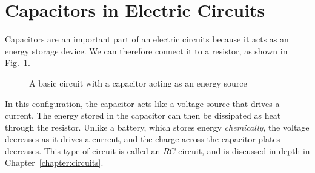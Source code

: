 \section{Capacitors in Electric Circuits}
Capacitors are an important part of an electric circuits because it acts as
an energy storage device. We can therefore connect it to a resistor, as shown
in Fig.~\ref{fig:very-basic-RC}.
\begin{figure}[ht]
  \centering
  \caption{A basic circuit with a capacitor acting as an energy source}
  \label{fig:very-basic-RC}
\end{figure}
In this configuration, the capacitor acts like a voltage source that drives a
current. The energy stored in the capacitor can then be dissipated as heat
through the resistor.  Unlike a battery, which stores energy \emph{chemically},
the voltage decreases as it drives a current, and the charge across the
capacitor plates decreases. This type of circuit is called an $RC$ circuit, and
is discussed in depth in Chapter~\ref{chapter:circuits}.
